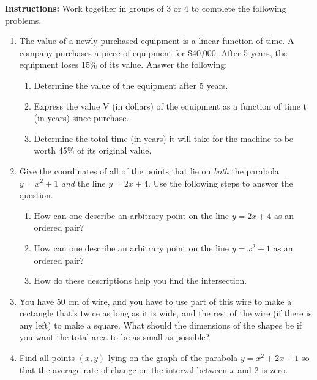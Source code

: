 

\noindent \textbf{Instructions:}  Work together in groups of  3 or 4 to complete the following problems.


\begin{enumerate}



\item The value of a newly purchased equipment is a linear function of
  time. A company purchases a piece of equipment for \$40,000. After 5
  years, the equipment loses 15\% of its value. Answer the following:

\begin{enumerate}
\item Determine the value of the equipment after 5 years.
\item Express the value V (in dollars) of the equipment as a function
  of time t (in years) since purchase.
\item Determine the total time (in years) it will take for the machine
  to be worth 45\% of its original value.
\end{enumerate}

\vfill

\item Give the coordinates of all of the points that lie on
  \emph{both} the parabola $y=x^2+1$ \emph{and} the line $y=2x+4$.
  Use the following steps to answer the question.
  \begin{enumerate}
  \item How can one describe an arbitrary point on the line $y=2x+4$
    as an ordered pair?
    \item How can one describe an arbitrary point on the line
      $y=x^2+1$ as an ordered pair?
    \item How do these descriptions help you find the intersection.
  \end{enumerate}

\vfill
\clearpage


\item You have 50 cm of wire, and you have to use part of this wire to
  make a rectangle that's twice as long as it is wide, and the rest of
  the wire (if there is any left) to make a square.  What should the
  dimensions of the shapes be if you want the total area to be as
  small as possible?

\clearpage

\item Find all points $(x,y)$ lying on the graph of the parabola
  $y = x^2 + 2x + 1$ so that the average rate of change on the
  interval between $x$ and $2$ is zero.


\end{enumerate}
